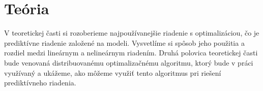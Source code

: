 \chapter{Teória}
\label{part:teoria}

V teoretickej časti si rozoberieme najpoužívanejšie riadenie s optimalizáciou, čo je prediktívne riadenie založené na modeli. Vysvetlíme si spôsob jeho použitia a rozdiel medzi lineárnym a nelineárnym riadením. Druhá polovica teoretickej časti bude venovaná distribuovanému optimalizačnému algoritmu, ktorý bude v práci využívaný a ukážeme, ako môžeme využiť tento algoritmus pri riešení prediktívneho riadenia.







